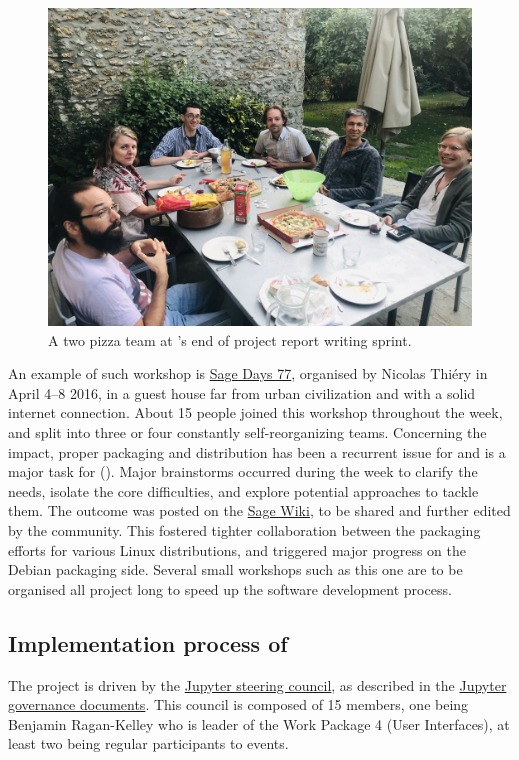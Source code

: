 \documentclass{deliverablereport}
\begin{document}
\begin{figure}
  \includegraphics[width=\textwidth]{two-pizza-meal.jpg}
  \caption{A two pizza team at \ODK's end of project report writing sprint.}
\end{figure}


An example of such workshop is
\href{https://wiki.sagemath.org/days77/}{Sage Days 77}, organised by
Nicolas Thiéry in April 4--8 2016, in a guest house far from urban
civilization and with a solid internet connection. About 15 people
joined this workshop throughout the week, and split into three or four
constantly self-reorganizing teams. Concerning the impact, proper
packaging and distribution has been a recurrent issue for \Sage and is
a major task for \ODK
(). Major
brainstorms occurred during the week to clarify the needs, isolate the
core difficulties, and explore potential approaches to tackle
them. The outcome was posted on the
\href{https://wiki.sagemath.org/days77/packaging}{Sage Wiki}, to be
shared and further edited by the community. This fostered tighter
collaboration between the packaging efforts for various Linux
distributions, and triggered major progress on the Debian packaging
side. Several small workshops such as this one are to be organised all
project long to speed up the software development process.


\subsection{Implementation process of \Jupyter}

The \Jupyter project is driven by the \href{https://jupyter.org/about.html}{Jupyter steering council}, as described in the \href{https://github.com/jupyter/governance}{Jupyter governance documents}. This council is composed of 15 members, one being Benjamin Ragan-Kelley who is leader of the Work Package 4 (User Interfaces),  at least two being regular participants to \ODK events.
\end{document}
